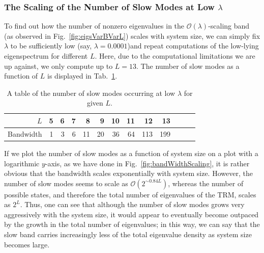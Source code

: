 \subsubsection{The Scaling of the Number of Slow Modes at Low $\lambda$}
To find out how the number of nonzero eigenvalues in the $\mathcal{O}(\lambda)$-scaling
band (as observed in Fig.~\ref{fig:eigsVarBVarL}) scales with system size,
we can simply fix $\lambda$ to be sufficiently low (say, $\lambda=0.0001$)and repeat
computations of the low-lying eigenspectrum for different $L$. Here, due to the
computational limitations we are up against, we only compute up to $L=13$. The number
of slow modes as a function of $L$ is displayed in Tab.~\ref{tab:bandThickness}.
\begin{table} \caption[Tabulated values for the variation of the width of the slow band with
system size.]{A table of the number of slow modes occurring at low $\lambda$ for given 
$L$.}
\begin{center}
\begin{tabular}{r || r | r | r | r | r | r | r | r | r | r | r | r} \label{tab:bandThickness}
 $L$ & 5 & 6 & 7 & 8 & 9 & 10 & 11 & 12 & 13 \\
 \hline
 Bandwidth & 1 & 3 & 6 & 11 & 20 & 36 & 64 & 113 & 199 \\
\end{tabular}
\end{center}
\end{table}
If we plot the number of slow modes as a function of system size on a plot with a 
logarithmic $y$-axis, as we have done in Fig.~\ref{fig:bandWidthScaling},
it is rather obvious that the bandwidth scales exponentially with system size.
However, the number of slow modes seems to scale as $\mathcal{O}(2^{\sim 0.84 L})$,
whereas the number of possible states, and therefore the total number of eigenvalues of
the TRM, scales as $2^L$. Thus, one can see that although the number of slow modes grows
very aggressively with the system size, it would appear to eventually become 
outpaced by the growth in the total number of eigenvalues; in this way, we can say that
the slow band carries increasingly less of the total eigenvalue density as system size
becomes large.
